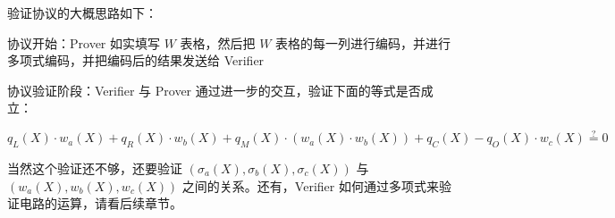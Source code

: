 验证协议的大概思路如下：

协议开始：Prover 如实填写 \(W\) 表格，然后把 \(W\)
表格的每一列进行编码，并进行多项式编码，并把编码后的结果发送给 Verifier

协议验证阶段：Verifier 与 Prover
通过进一步的交互，验证下面的等式是否成立：

\[
q_{L}(X) \cdot w_{a}(X) + q_{R}(X) \cdot w_{b}(X) + q_{M}(X)\cdot(w_{a}(X)\cdot w_{b}(X)) + q_{C}(X) -  q_{O}(X)\cdot w_{c}(X) \overset{?}{=} 0
\]

当然这个验证还不够，还要验证 \((\sigma_a(X),\sigma_b(X),\sigma_c(X))\)
与 \((w_a(X),w_b(X),w_c(X))\) 之间的关系。还有，Verifier
如何通过多项式来验证电路的运算，请看后续章节。





